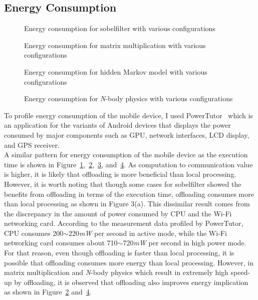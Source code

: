 \subsection{Energy Consumption}
\label{character:energy}
%
\begin{figure}
\centering
{}
\caption{Energy consumption for sobelfilter with various configurations}
\label{fig:energy_sobelfilter}
\end{figure}
%
\begin{figure}
\centering
{}
\caption{Energy consumption for matrix multiplication with various
configurations}
\label{fig:energy_matrix}
\end{figure}
%
\begin{figure}
\centering
{}
\caption{Energy consumption for hidden Markov model with various
configurations}
\label{fig:energy_hmm}
\end{figure}
%
\begin{figure}
\centering
{}
\caption{Energy consumption for {\it N}-body physics with various configurations}
\label{fig:energy_nbody}
\end{figure}
%
To profile energy consumption of the mobile device, I used
PowerTutor~\cite{powertutor} which is an application for the variants of Android
devices that displays the power consumed by major components such as
GPU, network interfaces, LCD display, and GPS receiver.\\ 
%
A similar pattern for energy consumption of the mobile device as
the execution time is shown in
Figure~\ref{fig:energy_sobelfilter},~\ref{fig:energy_matrix},~\ref{fig:energy_hmm},
and~\ref{fig:energy_nbody}.
%
As computation to communication value is higher, 
it is likely that offloading is more beneficial than local processing.
%
However, it is worth noting that though some cases for sobelfilter
showed the benefits from offloading in terms of the execution time,
offloading consumes more than local processing as shown in Figure
3(a).
%
This dissimilar result comes from the discrepancy in the amount of power
consumed by CPU and the Wi-Fi networking card.
%
According to the measurement data profiled by PowerTutor, CPU consumes
200$\sim$220{\it mW} per second in active mode, while the
Wi-Fi networking card consumes about 710$\sim$720{\it mW}
per second in high power mode.
%
For that reason, even though offloading is faster than local processing,
it is possible that offloading consumes more energy than local
processing.
%
However, in matrix multiplication and {\it N}-body physics which
result in extremely high speed-up by offloading, it is observed that
offloading also improves energy implication as shown in
Figure~\ref{fig:energy_matrix} and~\ref{fig:energy_nbody}. 
%
